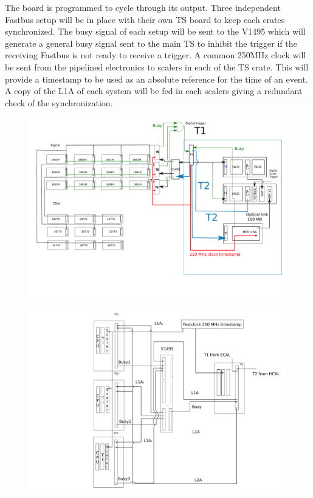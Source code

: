 \documentclass{article}
\begin{document}
The board is programmed to cycle through its output. 
Three independent Fastbus setup will be in place with their own TS board to keep each crates synchronized.
The busy signal of each setup will be sent to the V1495 which will generate a general busy signal sent to the main TS
to inhibit the trigger if the receiving Fastbus is not ready to receive a trigger. 
A common 250MHz clock will be sent from the pipelined electronics to scalers in each of the TS crate.
This will provide a timestamp to be used as an absolute reference for the time of an event.
A copy of the L1A of each system will be fed in each scalers giving a redundant check of the synchronization.

\begin{figure}
\includegraphics[scale=0.55]{figs/SBSlayoutOld.pdf}\\
\end{figure}

\begin{figure}
\includegraphics[scale=0.55]{figs/TSs.pdf}\\
\end{figure}
\end{document}
